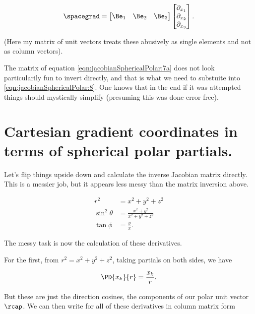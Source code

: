 \begin{align}\label{eqn:jacobianSphericalPolar:8}
\spacegrad = 
\begin{bmatrix}
\Be_1 & \Be_2 & \Be_3  
\end{bmatrix}
\begin{bmatrix}
\partial_{x_1} \\
\partial_{x_2} \\
\partial_{x_3}
\end{bmatrix}.
\end{align}

(Here my matrix of unit vectors treats these abusively as single elements and not as column vectors).

The matrix of equation \ref{eqn:jacobianSphericalPolar:7a} does not look particularily fun to invert directly, and that is what we need to substuite into
\ref{eqn:jacobianSphericalPolar:8}.  One knows that in the end if it was attempted things should mystically simplify (presuming this was done error free).

\section{Cartesian gradient coordinates in terms of spherical polar partials.}

Let's flip things upside down and calculate the inverse Jacobian matrix directly.  This is a messier job, but it appears less messy than the matrix inversion above.

\begin{subequations}\label{eqn:jacobianSphericalPolar:9}
\begin{align}
r^2 &= x^2 + y^2 + z^2  \\
\sin^2 \theta &= \frac{x^2 + y^2}{x^2 + y^2 + z^2} \\
\tan\phi &= \frac{y}{x}
.
\end{align}
\end{subequations}

The messy task is now the calculation of these derivatives.

For the first, from $r^2 = x^2 + y^2 + z^2$, taking partials on both sides, we have

\begin{align}\label{eqn:jacobianSphericalPolar:10}
\PD{x_k}{r} = \frac{x_k}{r}.
\end{align}

But these are just the direction cosines, the components of our polar unit vector $\rcap$.  We can then write for all of these derivatives in column matrix form

